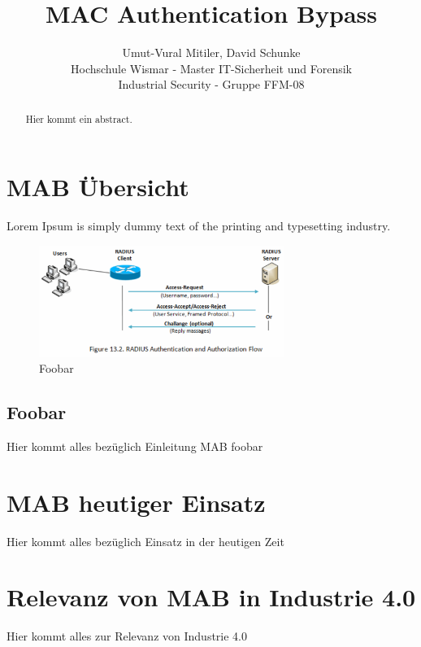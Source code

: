 \documentclass[conference]{IEEEtran}
\begin{document}
\title{MAC Authentication Bypass}
\author{
Umut-Vural Mitiler, David Schunke\\
Hochschule Wismar - Master IT-Sicherheit und Forensik\\
Industrial Security - Gruppe FFM-08
}

\maketitle

\begin{abstract}
Hier kommt ein abstract.
\end{abstract}

\section{MAB Übersicht}
Lorem Ipsum \cite{einstein} is simply dummy text of the printing and typesetting industry.

\begin{figure}[hbt]
  \centering
  \includegraphics[width=8cm]{figures/Radius}
  \caption{Foobar \cite{einstein}}
\end{figure}


\subsection{Foobar}
Hier kommt alles bezüglich Einleitung MAB foobar

\section{MAB heutiger Einsatz}
Hier kommt alles bezüglich Einsatz in der heutigen Zeit

\section{Relevanz von MAB in Industrie 4.0}
Hier kommt alles zur Relevanz von Industrie 4.0
\end{document}
